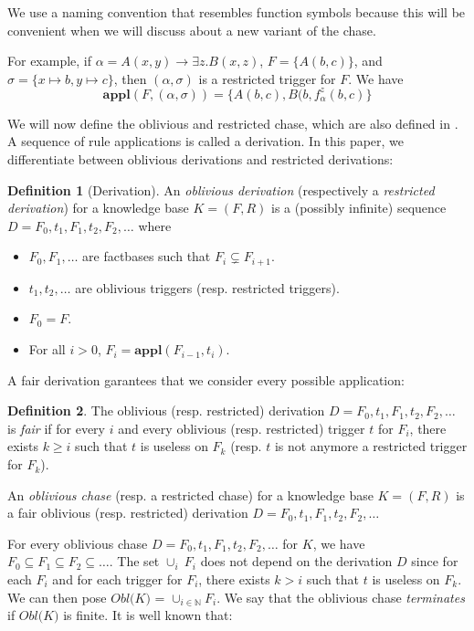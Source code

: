 \documentclass{article}
\theoremstyle{definition}
\newtheorem{definition}{Definition}[section]
\theoremstyle{remark}
\def \N {\mathbb N}
\newcommand{\Appl}{\textbf{appl}}
\begin{document}
We use a naming convention that resembles function symbols because this will be convenient when we will discuss about a new variant of the chase.

For example, if $\alpha = A(x,y) \rightarrow \exists z.B(x,z)$, $F = \{A(b,c)\}$, and $\sigma = \{x \mapsto b, y \mapsto c \}$, then $(\alpha,\sigma)$ is a restricted trigger for $F$. We have $$\Appl(F,(\alpha,\sigma)) = \{A(b,c),B(b,f_{\alpha}^z(b,c)\}$$

We will now define the oblivious and restricted chase, which are also defined in \cite{obl_res}. A sequence of rule applications is called a derivation. In this paper, we differentiate between oblivious derivations and restricted derivations:

\begin{definition}[Derivation]
An \emph{oblivious derivation} (respectively a \emph{restricted derivation}) for a knowledge base $K= (F,R)$ is a (possibly infinite) sequence $D=F_0,t_1,F_1,t_2,F_2,\ldots$ where 
\begin{itemize}
\item $F_0,F_1,\ldots$ are factbases such that $F_i \subsetneq F_{i+1}$.
\item $t_1,t_2,\ldots$ are oblivious triggers (resp. restricted triggers).
\item $F_0 = F$.
\item For all $i > 0$, $F_{i}= \Appl(F_{i-1},t_i)$.
\end{itemize}
\end{definition}

A fair derivation garantees that we consider every possible application:

\begin{definition}
The oblivious (resp. restricted) derivation $D=F_0,t_1,F_1,t_2,F_2,\ldots$ is \emph{fair} if for every $i$ and every oblivious (resp. restricted) trigger $t$ for $F_i$, there exists $k \geq i$ such that $t$ is useless on $F_k$ (resp. $t$ is not anymore a restricted trigger for $F_k$).

An \emph{oblivious chase} (resp. a restricted chase) for a knowledge base $K= (F,R)$ is a fair oblivious (resp. restricted) derivation $D=F_0,t_1,F_1,t_2,F_2,\ldots$ 
\end{definition}

For every oblivious chase $D = F_0,t_1,F_1,t_2,F_2,\ldots$ for $K$, we have $F_0 \subseteq F_1 \subseteq F_2 \subseteq \ldots$. The set $\cup_i~F_i$ does not depend on the derivation $D$ since for each $F_i$ and for each trigger for $F_i$, there exists $k>i$ such that $t$ is useless on $F_k$. We can then pose \emph{$\textit{Obl(K)}$} = $\cup_{i \in \N}F_i$. We say that the oblivious chase \emph{terminates} if $\textit{Obl(K)}$ is finite. It is well known that:
\end{document}
